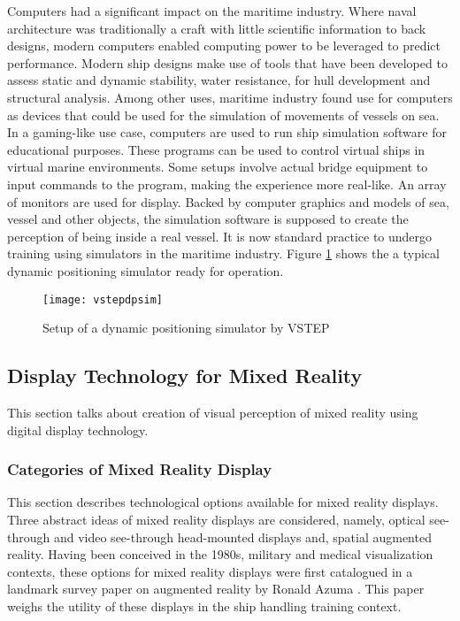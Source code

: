 Computers had a significant impact on the maritime industry. Where naval architecture was traditionally a craft with little scientific information to back designs, modern computers enabled computing power to be leveraged to predict performance. Modern ship designs make use of tools that have been developed to assess static and dynamic stability, water resistance, for hull development and structural analysis. Among other uses, maritime industry found use for computers as devices that could be used for the simulation of movements of vessels on sea. In a gaming-like use case, computers are used to run ship simulation software for educational purposes. These programs can be used to control virtual ships in virtual marine environments. Some setups involve actual bridge equipment to input commands to the program, making the experience more real-like. An array of monitors are used for display. Backed by computer graphics and models of sea, vessel and other objects, the simulation software is supposed to create the perception of being inside a real vessel. It is now standard practice to undergo training using simulators in the maritime industry. Figure \ref{fig:vstepdpsim} shows the a typical dynamic positioning simulator ready for operation. 


\begin{figure}
	\centering
	\texttt{[image: vstepdpsim]}
	\caption{Setup of a dynamic positioning simulator by VSTEP}
	\label{fig:vstepdpsim}
\end{figure}


\subsection{Display Technology for Mixed Reality}

This section talks about creation of visual perception of mixed reality using digital display technology. 


\subsubsection{Categories of Mixed Reality Display}
This section describes technological options available for mixed reality displays. Three abstract ideas of mixed reality displays are considered, namely, optical see-through and video see-through head-mounted displays and, spatial augmented reality. Having been conceived in the 1980s, military and medical visualization contexts, these options for mixed reality displays were first catalogued in a landmark survey paper on augmented reality by Ronald Azuma \cite{azuma1997survey}. This paper weighs the utility of these displays in the ship handling training context. 

